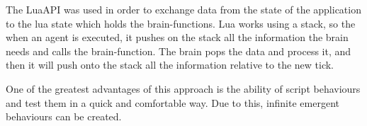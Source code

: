 The LuaAPI was used in order to exchange data from the state of the application to the lua state which holds the brain-functions. Lua works using a stack, so the when an agent is executed, it pushes on the stack all the information the brain needs and calls the brain-function. The brain pops the data and process it, and then it will push onto the stack all the information relative to the new tick.

One of the greatest advantages of this approach is the ability of script behaviours and test them in a quick and comfortable way. Due to this, infinite emergent behaviours can be created.

\ifx\isEmbedded\undefined


\pagebreak

\fi